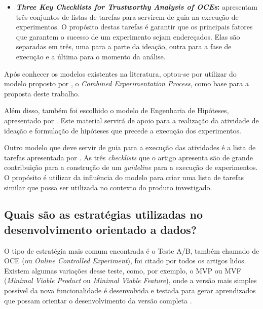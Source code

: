 \begin{itemize}
    \item \textbf{\textit{Three Key Checklists for Trustworthy Analysis of OCEs}:}  apresentam três conjuntos de listas de tarefas para servirem de guia na execução de experimentos. O propósito destas tarefas é garantir que os principais fatores que garantem o sucesso de um experimento sejam endereçados. Elas são separadas em três, uma para a parte da ideação, outra para a fase de execução e a última para o momento da análise.
    
    
\end{itemize}

Após conhecer os modelos existentes na literatura, optou-se por utilizar do modelo proposto por , o \textit{Combined Experimentation Process}, como base para a proposta deste trabalho.

Além disso, também foi escolhido o modelo de Engenharia de Hipóteses, apresentado por . Este material servirá de apoio para a realização da atividade de ideação e formulação de hipóteses que precede a execução dos experimentos.

Outro modelo que deve servir de guia para a execução das atividades é a lista de tarefas apresentada por . As três \textit{checklists} que o artigo apresenta são de grande contribuição para a construção de um \textit{guideline} para a execução de experimentos. O propósito é utilizar da influência do modelo para criar uma lista de tarefas similar que possa ser utilizada no contexto do produto investigado.



\subsection{Quais são as estratégias utilizadas no desenvolvimento orientado a dados?}

O tipo de estratégia mais comum encontrada é o Teste A/B, também chamado de OCE (ou \textit{Online Controlled Experiment}), foi citado por todos os artigos lidos. Existem algumas variações desse teste, como, por exemplo, o MVP ou MVF (\textit{Minimal Viable Product} ou \textit{Minimal Viable Feature}), onde a versão mais simples possível da nova funcionalidade é desenvolvida e testada para gerar aprendizados que possam orientar o desenvolvimento da versão completa \cite{fabijan_online_2020} \cite{chen_understanding_2024} \cite{kohavi_online_2013} \cite{fagerholm_right_2017} \cite{sauvola_towards_2015} \cite{melegati_hypotheses_2019} \cite{kuhrmann_activity_2018}.

